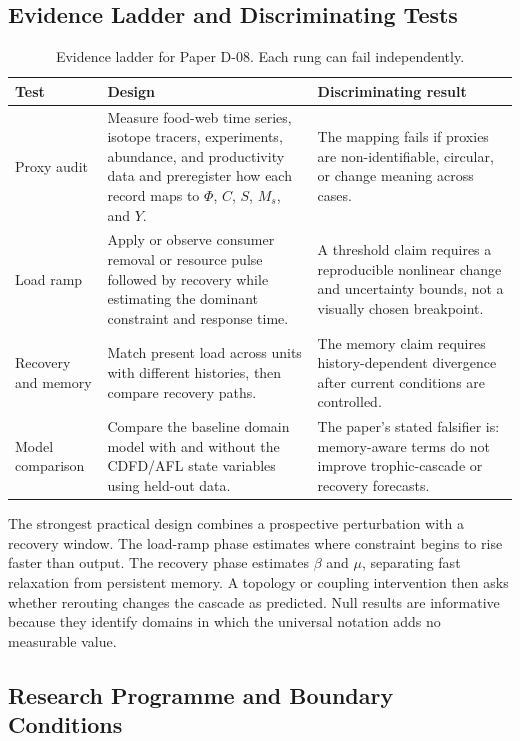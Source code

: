 \documentclass[11pt]{article}
\begin{document}
\subsection{Evidence Ladder and Discriminating Tests}

\begin{table}[htbp]
\centering
\small
\caption{Evidence ladder for Paper D-08. Each rung can fail independently.}
\begin{tabularx}{\textwidth}{|p{}|X|X|}
\hline
\textbf{Test} & \textbf{Design} & \textbf{Discriminating result} \\
\hline
Proxy audit & Measure food-web time series, isotope tracers, experiments, abundance, and productivity data and preregister how each record maps to $\Phi$, $C$, $S$, $M_s$, and $Y$. & The mapping fails if proxies are non-identifiable, circular, or change meaning across cases. \\
\hline
Load ramp & Apply or observe consumer removal or resource pulse followed by recovery while estimating the dominant constraint and response time. & A threshold claim requires a reproducible nonlinear change and uncertainty bounds, not a visually chosen breakpoint. \\
\hline
Recovery and memory & Match present load across units with different histories, then compare recovery paths. & The memory claim requires history-dependent divergence after current conditions are controlled. \\
\hline
Model comparison & Compare the baseline domain model with and without the CDFD/AFL state variables using held-out data. & The paper's stated falsifier is: memory-aware terms do not improve trophic-cascade or recovery forecasts. \\
\hline
\end{tabularx}
\end{table}

The strongest practical design combines a prospective perturbation with a
recovery window. The load-ramp phase estimates where constraint begins to rise
faster than output. The recovery phase estimates $\beta$ and $\mu$, separating
fast relaxation from persistent memory. A topology or coupling intervention
then asks whether rerouting changes the cascade as predicted. Null results are
informative because they identify domains in which the universal notation adds
no measurable value.

\subsection{Research Programme and Boundary Conditions}
\end{document}
